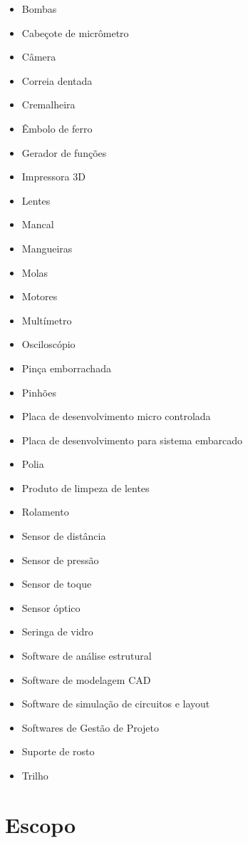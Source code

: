 \begin{itemize}	
\item Bombas
\item Cabeçote de micrômetro 
\item Câmera
\item Correia dentada
\item Cremalheira
\item Êmbolo de ferro
\item Gerador de funções 
\item Impressora 3D
\item Lentes
\item Mancal
\item Mangueiras 
\item Molas
\item Motores
\item Multímetro
\item Osciloscópio 
\item Pinça emborrachada
\item Pinhões
\item Placa de desenvolvimento micro controlada
\item Placa de desenvolvimento para sistema embarcado
\item Polia
\item Produto de limpeza de lentes
\item Rolamento
\item Sensor de distância
\item Sensor de pressão
\item Sensor de toque
\item Sensor óptico
\item Seringa de vidro
\item Software de análise estrutural
\item Software de modelagem CAD
\item Software de simulação de circuitos e layout
\item Softwares de Gestão de Projeto
\item Suporte de rosto
\item Trilho
\end{itemize}


\section[Escopo]{Escopo}

